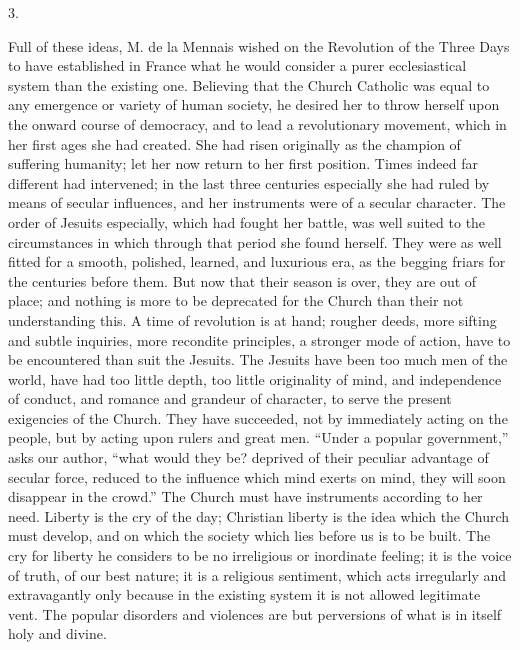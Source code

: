 3.

Full of these ideas, M. de la Mennais wished on
the Revolution of the Three Days to have established in France what he
would consider a purer ecclesiastical system than the existing one.
Believing that the Church Catholic was equal to any emergence or
variety of human society, he desired her to throw herself upon the
onward course of democracy, and to lead a revolutionary movement,
which in her first ages she had created. She had risen originally as
the champion of suffering humanity; let her now return to her first
position. Times indeed far different had intervened; in the last three
centuries especially she had ruled by means of secular influences, and
her instruments were of a secular character. The order of Jesuits
especially, which had fought her battle, was well suited to the
circumstances in which through that period she found herself. They
were as well fitted for a smooth, polished, learned, and
luxurious era, as the begging friars for the centuries before them.
But now that their season is over, they are out of place; and nothing
is more to be deprecated for the Church than their not understanding
this. A time of revolution is at hand; rougher deeds, more sifting and
subtle inquiries, more recondite principles, a stronger mode of
action, have to be encountered than suit the Jesuits. The Jesuits have
been too much men of the world, have had too little depth, too little
originality of mind, and independence of conduct, and romance and
grandeur of character, to serve the present exigencies of the Church. They have succeeded, not by immediately acting on
the people, but by acting upon rulers and great men. ``Under a popular
government,'' asks our author, ``what would they be? deprived of their
peculiar advantage of secular force, reduced to the influence which
mind exerts on mind, they will soon disappear in the crowd.'' The
Church must have instruments according to her need. Liberty is the cry
of the day; Christian liberty is the idea which the Church must
develop, and on which the society which lies before us is to be built.
The cry for liberty he considers to be no irreligious or inordinate
feeling; it is the voice of truth, of our best nature; it is a
religious sentiment, which acts irregularly and extravagantly only
because in the existing system it is not allowed legitimate vent. The
popular disorders and violences are but perversions of what is in
itself holy and divine.

